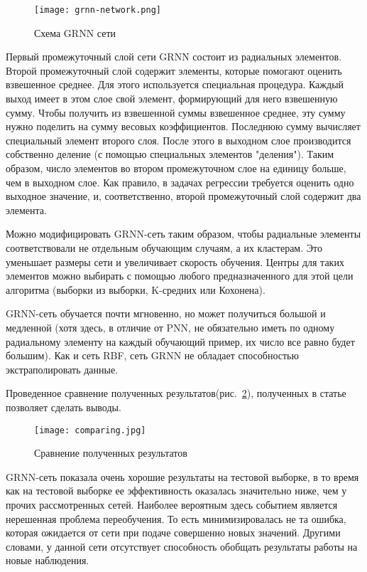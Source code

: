 \begin{figure}[!ht]
  \centering
  \texttt{[image: grnn-network.png]} 
  \caption{Схема GRNN сети}
  \label{fig:analysis:grnn-network}
\end{figure}

Первый промежуточный слой сети GRNN состоит из радиальных элементов. Второй промежуточный слой содержит элементы,
которые помогают оценить взвешенное среднее. Для этого используется специальная процедура. Каждый выход имеет в этом
слое свой элемент, формирующий для него взвешенную сумму. Чтобы получить из взвешенной суммы взвешенное среднее, эту
сумму нужно поделить на сумму весовых коэффициентов. Последнюю сумму вычисляет специальный элемент второго слоя.
После этого в выходном слое производится собственно деление (с помощью специальных элементов "деления"). Таким
образом, число элементов во втором промежуточном слое на единицу больше, чем в выходном слое. Как правило, в задачах
регрессии требуется оценить одно выходное значение, и, соответственно, второй промежуточный слой содержит два элемента.

Можно модифицировать GRNN-сеть таким образом, чтобы радиальные элементы соответствовали не отдельным обучающим
случаям, а их кластерам. Это уменьшает размеры сети и увеличивает скорость обучения. Центры для таких элементов
можно выбирать с помощью любого предназначенного для этой цели алгоритма (выборки из выборки, K-средних или Кохонена).

GRNN-сеть обучается почти мгновенно, но может получиться большой и медленной (хотя здесь, в отличие от PNN, не
обязательно иметь по одному радиальному элементу на каждый обучающий пример, их число все равно будет большим).
Как и сеть RBF, сеть GRNN не обладает способностью экстраполировать данные.

Проведенное сравнение полученных результатов(рис.~\ref{fig:analysis:comparing}),
полученных в статье~\cite{using_neural_engines} позволяет сделать выводы.

\begin{figure}[!ht]
  \centering
  \texttt{[image: comparing.jpg]} 
  \caption{Сравнение полученных результатов}
  \label{fig:analysis:comparing}
\end{figure}

GRNN-сеть показала очень хорошие результаты на тестовой выборке, в то время как на тестовой выборке ее эффективность
оказалась значительно ниже, чем у прочих рассмотренных сетей. Наиболее вероятным здесь событием является нерешенная
проблема переобучения. То есть минимизировалась не та ошибка, которая ожидается от сети при подаче совершенно новых
значений. Другими словами, у данной сети отсутствует способность обобщать результаты работы на новые наблюдения.


